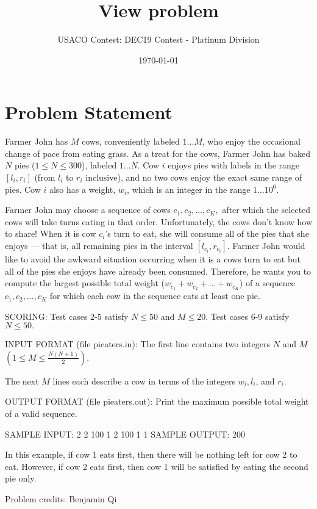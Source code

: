 \documentclass[12pt]{article}
\title{View problem}
\author{USACO Contest: DEC19 Contest - Platinum Division}
\date{\today}
\begin{document}
\maketitle

\section*{Problem Statement}

Farmer John has $M$ cows, conveniently labeled $1 \ldots M$, who enjoy the occasional change of pace
from eating grass.  As a treat for the cows, Farmer John has baked $N$ pies ($1 \leq N \leq 300$), labeled
$1 \ldots N$.  Cow $i$ enjoys pies with labels in the range $[l_i, r_i]$ (from $l_i$ to $r_i$ inclusive),
and no two cows enjoy the exact same range of pies.  Cow $i$ also has a weight, $w_i$, which 
is an integer in the range $1 \ldots 10^6$.

Farmer John may choose a sequence of cows $c_1,c_2,\ldots, c_K,$ after which the
selected cows will take turns eating in that order. Unfortunately, the cows 
don't know how to share! When it is cow $c_i$'s turn to eat, she will consume
all of the  pies that she enjoys --- that is, all remaining pies in the interval
$[l_{c_i},r_{c_i}]$.  Farmer John would like to avoid the awkward situation
occurring when it is a cows turn to eat but all of the pies she enjoys have already been
consumed. Therefore, he wants you to compute the largest possible total weight
($w_{c_1}+w_{c_2}+\ldots+w_{c_K}$) of a sequence $c_1,c_2,\ldots, c_K$ for which each cow in the
sequence eats at least one pie.

SCORING:
Test cases 2-5 satisfy $N\le 50$ and $M\le 20$.  Test cases 6-9 satisfy $N\le 50.$ 

INPUT FORMAT (file pieaters.in):
The first line contains two integers $N$ and $M$
$\left(1\le M\le \frac{N(N+1)}{2}\right)$. 

The next $M$ lines each describe a cow in terms of the integers $w_i, l_i$, and $r_i$.

OUTPUT FORMAT (file pieaters.out):
Print the maximum possible total weight of a valid sequence.

SAMPLE INPUT:
2 2
100 1 2
100 1 1
SAMPLE OUTPUT: 
200

In this example, if cow 1 eats first, then there will be nothing left for cow 2 to eat. However,
if cow 2 eats first, then cow 1 will be satisfied by eating the second pie only.

Problem credits: Benjamin Qi
\end{document}
